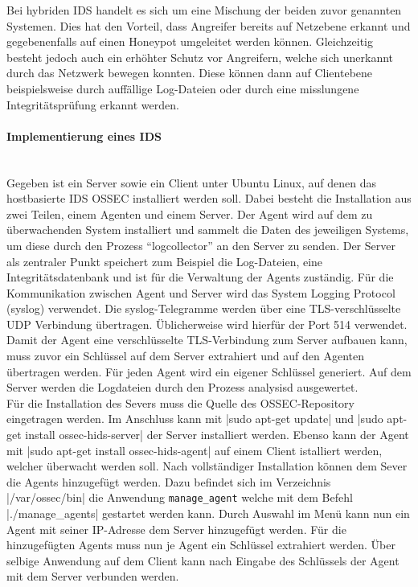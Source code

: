 \noindent Bei hybriden \ac{IDS} handelt es sich um eine Mischung der beiden zuvor genannten Systemen. Dies hat den Vorteil, dass Angreifer bereits auf Netzebene erkannt und gegebenenfalls auf einen Honeypot umgeleitet werden können. Gleichzeitig besteht jedoch auch ein erhöhter Schutz vor Angreifern, welche sich unerkannt durch das Netzwerk bewegen konnten. Diese können dann auf Clientebene beispielsweise durch auffällige Log-Dateien oder durch eine misslungene Integritätsprüfung erkannt werden.\\

\paragraph{Implementierung eines IDS}
\noindent \\Gegeben ist ein Server sowie ein Client unter Ubuntu Linux, auf denen das hostbasierte IDS OSSEC installiert werden soll. Dabei besteht die Installation aus zwei Teilen, einem Agenten und einem Server. Der Agent wird auf dem zu überwachenden System installiert und sammelt die Daten des jeweiligen Systems, um diese durch den Prozess "`logcollector"' an den Server zu senden. Der Server als zentraler Punkt speichert zum Beispiel die Log-Dateien, eine Integritätsdatenbank und ist für die Verwaltung der Agents zuständig. Für die Kommunikation zwischen Agent und Server wird das System Logging Protocol (syslog) verwendet. Die syslog-Telegramme werden über eine \ac{TLS}-verschlüsselte UDP Verbindung übertragen. Üblicherweise wird hierfür der Port 514 verwendet. Damit der Agent eine verschlüsselte \ac{TLS}-Verbindung zum Server aufbauen kann, muss zuvor ein Schlüssel auf dem Server extrahiert und auf den Agenten übertragen werden. Für jeden Agent wird ein eigener Schlüssel generiert. Auf dem Server werden die Logdateien durch den Prozess analysisd ausgewertet.\\

\noindent Für die Installation des Severs muss die Quelle des OSSEC-Repository eingetragen werden. Im Anschluss kann mit |sudo apt-get update| und |sudo apt-get install ossec-hids-server| der Server installiert werden. 
Ebenso kann der Agent mit |sudo apt-get install ossec-hids-agent| auf einem Client istalliert werden, welcher überwacht werden soll. Nach vollständiger Installation können dem Sever die Agents hinzugefügt werden. Dazu befindet sich im Verzeichnis |/var/ossec/bin| die Anwendung \verb+manage_agent+ welche mit dem Befehl |./manage_agents| gestartet werden kann. 
Durch Auswahl im Menü kann nun ein Agent mit seiner IP-Adresse dem Server hinzugefügt werden. Für die hinzugefügten Agents muss nun je Agent ein Schlüssel extrahiert werden. Über selbige Anwendung auf dem Client kann nach Eingabe des Schlüssels der Agent mit dem Server verbunden werden.\\

